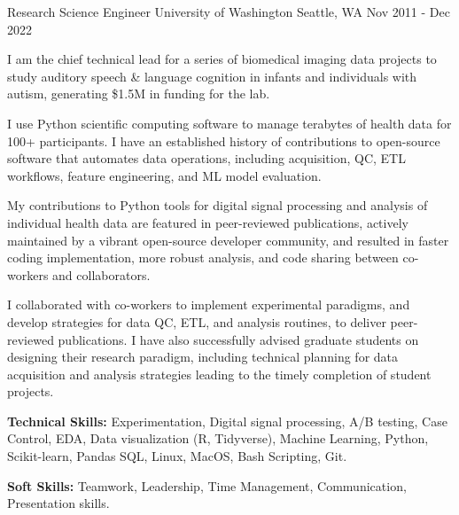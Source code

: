 

\begin{cventries}

  \cventry
  {Research Science Engineer} %
  {University of Washington} %
  {Seattle, WA} %
  {Nov 2011 - Dec 2022} %
  {
    \begin{cvitems} %
      \item {I am the chief technical lead for a series of biomedical imaging data projects to study auditory speech \& language cognition in infants and individuals with autism, generating \$1.5M in funding for the lab.}
      \item {I use Python scientific computing software to manage terabytes of health data for 100+ participants. I have an established history of contributions to open-source software that automates data operations, including acquisition, QC, ETL workflows, feature engineering, and ML model evaluation.}
      \item {My contributions to Python tools for digital signal processing and analysis of individual health data are featured in peer-reviewed publications, actively maintained by a vibrant open-source developer community, and resulted in faster coding implementation, more robust analysis, and code sharing between co-workers and collaborators.}
      \item {I collaborated with co-workers to implement experimental paradigms, and develop strategies for data QC, ETL, and analysis routines, to deliver peer-reviewed publications. I have also successfully advised graduate students on designing their research paradigm, including technical planning for data acquisition and analysis strategies leading to the timely completion of student projects.}
      \item {\textbf{Technical Skills:} Experimentation, Digital signal processing, A/B testing, Case Control, EDA, Data visualization (R, Tidyverse), Machine Learning, Python, Scikit-learn, Pandas SQL, Linux, MacOS, Bash Scripting, Git.}
      \item {\textbf{Soft Skills:} Teamwork, Leadership, Time Management, Communication, Presentation skills.}
    \end{cvitems}
  }


\end{cventries}
